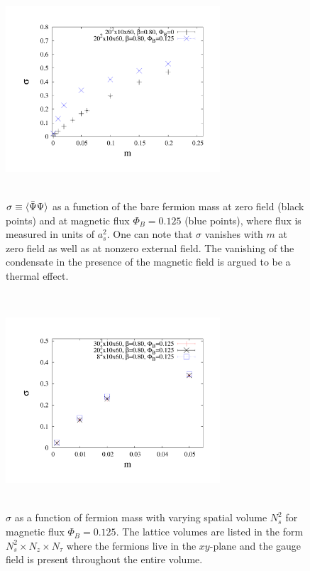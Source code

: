 \documentclass[aps,prd,twocolumn,showpacs,superscriptaddress,groupedaddress]{revtex4}  %
\begin{document}
\begin{figure}
\includegraphics[height=8cm,width=8cm]{pbp_vs_m_compare_graphene_paper.pdf} \hspace{-1cm}
\caption{$\sigma \equiv {\langle {\bar \Psi}\Psi \rangle}$ as a function of the bare fermion mass at zero field (black points) and at magnetic flux $\Phi_B=0.125$ (blue points), where flux is measured in units of $a^2_s$. One can note that $\sigma$ vanishes with $m$ at zero field as well as at nonzero external field. The vanishing of the condensate in the presence of the magnetic field is argued to be a thermal effect.}
\label{PBPComparison}
\end{figure}

\begin{figure}
\includegraphics[height=8cm,width=8cm]{pbp_vs_m_PHI0125_volcompare_3_graphene_paper.pdf} \hspace{-1cm}
\caption{$\sigma$ as a function of fermion mass with varying spatial volume $N^2_s$ for magnetic flux $\Phi_B=0.125$. The lattice volumes are listed in the form $N_s^2\times N_z \times N_{\tau}$ where the fermions live in the $xy$-plane and the gauge field is present throughout the entire volume.}
\label{PBPVolume}
\end{figure}
\end{document}
